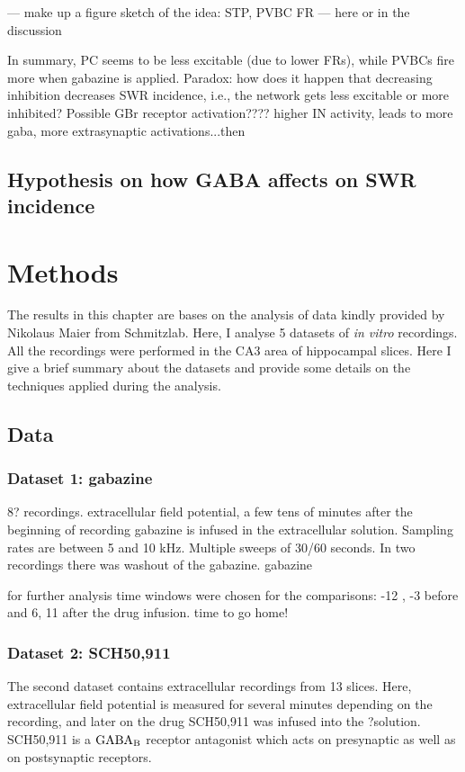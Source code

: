     --- make up a figure sketch of the idea: STP, PVBC FR --- here or in the discussion

    
    In summary, PC seems to be less excitable (due to lower FRs), while PVBCs
    fire more when gabazine is applied. Paradox: how does it happen that
    decreasing inhibition decreases SWR incidence, i.e., the network gets less
    excitable or more inhibited? Possible GBr receptor activation???? higher IN
    activity, leads to more gaba, more extrasynaptic activations...then 

  \subsection{Hypothesis on how GABA affects on SWR incidence} 


\section{Methods}
  The results in this chapter are bases on the analysis of data kindly provided
  by Nikolaus Maier from Schmitzlab. Here, I analyse 5 datasets of {\it in
  vitro} recordings. All the recordings were performed in the CA3 area of
  hippocampal slices. Here I give a brief summary about the datasets and
  provide some details on the techniques applied during the analysis.

  \subsection{Data}
    \subsubsection{Dataset 1: gabazine}
     
      8? recordings.
      extracellular field potential, a few tens of minutes after the beginning of recording gabazine is infused in the extracellular solution.
      Sampling rates are between 5 and 10 kHz.
      Multiple sweeps of 30/60 seconds.
      In two recordings there was washout of the gabazine.
      gabazine 


      for further analysis time windows were chosen for the comparisons:
        -12 , -3 before and 6, 11 after the drug infusion.
        time to go home!




    \subsubsection{Dataset 2: SCH50,911}
      The second dataset contains extracellular recordings from 13 slices.
      Here, extracellular field potential is measured for several minutes
      depending on the recording, and later on the drug SCH50,911 was infused
      into the ?solution.  SCH50,911 is a ${\rm GABA_B}$ receptor antagonist
      which acts on presynaptic as well as on postsynaptic receptors.

